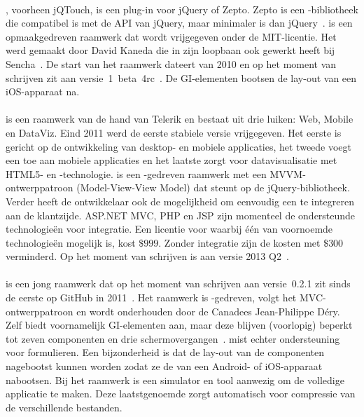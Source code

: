 \paragraph{\jqt}%
\jqt{}, voorheen jQTouch, is een plug-in voor jQuery of Zepto.
Zepto is een \js{}-bibliotheek die compatibel is met de API van jQuery, maar minimaler is dan jQuery~\cite{Zepto2013}.
\jqt{} is een opmaakgedreven raamwerk dat wordt vrijgegeven onder de MIT-licentie.
Het werd gemaakt door David Kaneda die in zijn loopbaan ook gewerkt heeft bij Sencha~\cite{JQT2013,Kaneda2013}.
De start van het raamwerk dateert van 2010 en op het moment van schrijven zit \jqt{} aan versie~1~beta~4rc~\cite{JQTouch2010,JQT2013}.
De GI-elementen bootsen de lay-out van een iOS-apparaat na.

\paragraph{\kendo} %
\kendo{} is een raamwerk van de hand van Telerik en bestaat uit drie luiken:  Web, Mobile en DataViz.
Eind 2011 werd de eerste stabiele versie vrijgegeven.
Het eerste is gericht op de ontwikkeling van desktop- en mobiele applicaties,  het tweede voegt een  toe aan mobiele applicaties en het laatste zorgt voor datavisualisatie met HTML5- en \js{}-technologie.
\kendo{} is een \js{}-gedreven raamwerk met een MVVM-ontwerppatroon (Model-View-View Model) dat steunt op de jQuery-bibliotheek.
Verder heeft de ontwikkelaar ook de mogelijkheid om eenvoudig een  te integreren aan de klantzijde.
ASP.NET MVC,  PHP en JSP zijn momenteel de ondersteunde technologieën voor integratie.
Een licentie voor \kendo{} waarbij één van voornoemde technologieën mogelijk is, kost $\$999$.
Zonder  integratie zijn de kosten met $\$300$ verminderd.
Op het moment van schrijven is \kendo{} aan versie 2013 Q2~\cite{Telerike}.

\paragraph{\moobile} %
\moobile{} is een jong raamwerk dat op het moment van schrijven aan versie~0.2.1 zit sinds de eerste  op GitHub in 2011~\cite{Dery2013}.
Het raamwerk is \js{}-gedreven, volgt het MVC-ontwerppatroon en wordt onderhouden door de Canadees Jean-Philippe Déry.
Zelf biedt \moobile{} voornamelijk GI-elementen aan, maar deze blijven (voorlopig) beperkt tot zeven componenten en drie schermovergangen~\cite{Dery2013}.
\moobile{} mist echter ondersteuning voor formulieren.
Een bijzonderheid is dat de lay-out van de componenten nagebootst kunnen worden zodat ze de  van een Android- of iOS-apparaat nabootsen.
Bij het raamwerk is een simulator en tool aanwezig om de volledige applicatie te maken.
Deze laatstgenoemde zorgt automatisch voor compressie van de verschillende bestanden.

